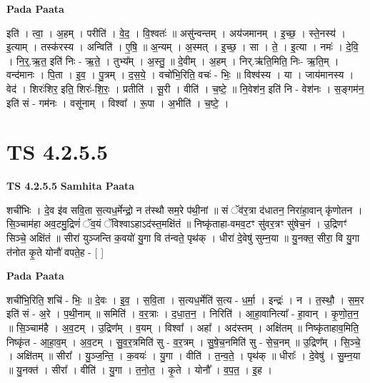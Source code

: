 \documentclass[17pt]{extarticle}
\begin{document}
\textbf{Pada Paata} \newline

इति॑ । त्वा॒ । अ॒हम् । परीति॑ । वे॒द॒ । वि॒श्वतः॑ ॥ असु॑न्वन्तम् । अय॑जमानम् । इ॒च्छ॒ । स्ते॒नस्य॑ । इ॒त्याम् । तस्क॑रस्य । अन्विति॑ । ए॒षि॒ ॥ अ॒न्यम् । अ॒स्मत् । इ॒च्छ॒ । सा । ते॒ । इ॒त्या । नमः॑ । दे॒वि॒ । नि॒र्॒.ऋ॒त॒ इति॑ निः - ऋ॒ते॒ । तुभ्य᳚म् । अ॒स्तु॒ ॥ दे॒वीम् । अ॒हम् । निर्.ऋ॑ति॒मिति॒ निः- ऋ॒ति॒म् । वन्द॑मानः । पि॒ता । इ॒व॒ । पु॒त्रम् । द॒स॒ये॒ । वचो॑भि॒रिति॒ वचः॑ - भिः॒ ॥ विश्व॑स्य । या । जाय॑मानस्य । वेद॑ । शिरः॑शिर॒ इति॒ शिरः॑-शि॒रः॒ । प्रतीति॑ । सू॒री । वीति॑ । च॒ष्टे॒ ॥ नि॒वेश॑न॒ इति॑ नि - वेश॑नः । स॒ङ्गम॑न॒ इति॑ सं - गम॑नः । वसू॑नाम् । विश्वा᳚ । रू॒पा । अ॒भीति॑ । च॒ष्टे॒ ।  \newline




\section*{ TS 4.2.5.5 }

\textbf{TS 4.2.5.5 } \newline
\textbf{Samhita Paata} \newline

शची॑भिः । दे॒व इ॑व सवि॒ता स॒त्यध॒र्मेन्द्रो॒ न त॑स्थौ सम॒रे प॑थी॒नां ॥ सं ॅव॑र॒त्रा द॑धातन॒ निरा॑हा॒वान् कृ॑णोतन । सि॒ञ्चाम॑हा अव॒टमु॒द्रिणं॑ ॅव॒यं ॅविश्वाऽहाऽद॑स्त॒मक्षि॑तं ॥ निष्कृ॑ताहा-वमव॒टꣳ सु॑वर॒त्रꣳ सु॑षेच॒नं । उ॒द्रिणꣳ॑ सिञ्चे॒ अक्षि॑तं ॥ सीरा॑ युञ्जन्ति क॒वयो॑ यु॒गा वि त॑न्वते॒ पृथ॑क् । धीरा॑ दे॒वेषु॑ सुम्न॒या ॥ यु॒नक्त॒ सीरा॒ वि यु॒गा त॑नोत कृ॒ते योनौ॑ वपते॒ह - [  ] \newline

\textbf{Pada Paata} \newline

शची॑भि॒रिति॒ शचि॑ - भिः॒ ॥ दे॒वः । इ॒व॒ । स॒वि॒ता । स॒त्यध॒र्मेति॑ स॒त्य - ध॒र्मा॒ । इन्द्रः॑ । न । त॒स्थौ॒ । स॒म॒र इति॑ सं - अ॒रे । प॒थी॒नाम् ॥ समिति॑ । व॒र॒त्राः । द॒धा॒त॒न॒ । निरिति॑ । आ॒हा॒वानित्या᳚ - हा॒वान् । कृ॒णो॒त॒न॒ ॥ सि॒ञ्चाम॑है । अ॒व॒टम् । उ॒द्रिण᳚म् । व॒यम् । विश्वा᳚ । अहा᳚ । अद॑स्तम् । अक्षि॑तम् ॥ निष्कृ॑ताहाव॒मिति॒ निष्कृ॑त - आ॒हा॒व॒म् । अ॒व॒टम् । सु॒व॒र॒त्रमिति॑ सु - व॒र॒त्रम् । सु॒षे॒च॒नमिति॑ सु - से॒च॒नम् ॥ उ॒द्रिण᳚म् । सि॒ञ्चे॒ । अक्षि॑तम् ॥ सीरा᳚ । यु॒ञ्ज॒न्ति॒ । क॒वयः॑ । यु॒गा । वीति॑ । त॒न्व॒ते॒ । पृथ॑क् ॥ धीराः᳚ । दे॒वेषु॑ । सु॒म्न॒या ॥ यु॒नक्त॑ । सीरा᳚ । वीति॑ । यु॒गा । त॒नो॒त॒ । कृ॒ते । योनौ᳚ । व॒प॒त॒ । इ॒ह ।  \newline
\end{document}
